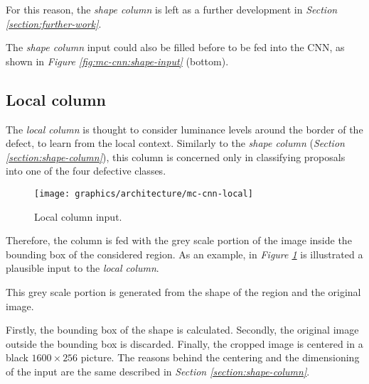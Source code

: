         \par{
            For this reason, the \emph{shape column} is left as a further development in \emph{Section \ref{section:further-work}}.
        }
        \par{
            The \emph{shape column} input could also be filled before to be fed into the CNN, as shown in \emph{Figure \ref{fig:mc-cnn:shape-input}} (bottom).
        }
    \subsection{Local column}\label{section:local-column}
        \par{
            The \emph{local column} is thought to consider luminance levels around the border of the defect, to learn from the local context. Similarly to the \emph{shape column} (\emph{Section \ref{section:shape-column}}), this column is concerned only in classifying proposals into one of the four defective classes.
        }
        \begin{figure}
            \centering
            \texttt{[image: graphics/architecture/mc-cnn-local]}
            \caption{Local column input.}\label{fig:mc-cnn:local-input}
        \end{figure}
        \par{
            Therefore, the column is fed with the grey scale portion of the image inside the bounding box of the considered region. As an example, in \emph{Figure \ref{fig:mc-cnn:local-input}} is illustrated a plausible input to the \emph{local column}.
        }
        \par{
            This grey scale portion is generated from the shape of the region and the original image.
        }
        \par{
            Firstly, the bounding box of the shape is calculated. Secondly, the original image outside the bounding box is discarded. Finally, the cropped image is centered in a black $1600\times 256$ picture. The reasons behind the centering and the dimensioning of the input are the same described in \emph{Section \ref{section:shape-column}}.
        }
